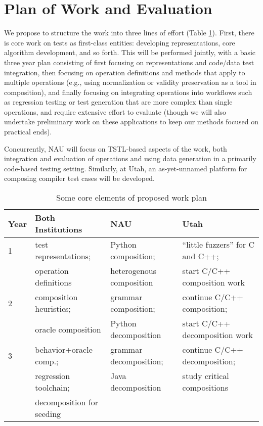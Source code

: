 \section{Plan of Work and Evaluation}

We propose to structure the work into three lines of effort (Table
\ref{tab:work}).  First, there is core work on tests as first-class
entities: developing representations, core algorithm development, and
so forth.  This will be performed jointly, with a basic three year
plan consisting of first focusing on representations and code/data
test integration, then focusing on operation definitions and methods
that apply to multiple operations (e.g., using normalization or
validity preservation as a tool in composition), and finally focusing
on integrating operations into workflows such as regression testing or
test generation that are more complex than single operations, and
require extensive effort to evaluate (though we will also undertake
preliminary work on these applications to keep our methods focused on
practical ends).

Concurrently, NAU will focus on TSTL-based aspects of the work, both
integration and evaluation of operations and using data generation in
a primarily code-based testing setting.  Similarly, at Utah, an as-yet-unnamed
platform for composing compiler test cases will be developed.

\begin{table}
  \begin{tabular}{l|l|l|l}
Year       & Both Institutions             & NAU                         & Utah\\
\hline
1 & test representations;         & Python composition;           & ``little fuzzers'' for C and C++;\\
       & operation definitions         & heterogenous composition     & start C/C++ composition work\\
\hline
2 & composition heuristics;       & grammar composition;        & continue C/C++ composition;\\
       & oracle composition  & Python decomposition  & start C/C++ decomposition work\\
\hline
3 & behavior+oracle comp.; & grammar decomposition; & continue C/C++ decomposition;  \\
       & regression toolchain;  & Java decomposition   & study critical compositions \\
  & decomposition for seeding \\
\end{tabular}
\caption{Some core elements of proposed work plan}
\label{tab:work}
\end{table}

